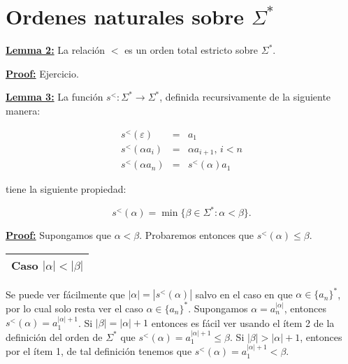 \section{Ordenes naturales sobre $\Sigma^{\ast}$}

  \textbf{\underline{Lemma 2:}} La relación $<$ es un orden total estricto sobre $\Sigma^{\ast}$.

  \textbf{\underline{Proof:}} Ejercicio.

  \QED

  \vspace{5mm}
  \textbf{\underline{Lemma 3:}} La función $s^{<}: \Sigma^{\ast} \rightarrow \Sigma^{\ast}$, definida recursivamente
    de la siguiente manera:

    \begin{eqnarray}
			\nonumber s^{<}(\varepsilon) &=& a_{1} \\
			\nonumber s^{<}(\alpha a_{i}) &=& \alpha a_{i + 1} \text{, } i < n \\
			\nonumber s^{<}(\alpha a_{n}) &=& s^{<}(\alpha) a_{1}
		\end{eqnarray}

    tiene la siguiente propiedad:

    \[
      \displaystyle s^{<}(\alpha) = \min \{\beta \in \Sigma^{\ast}: \alpha < \beta \}\text{.}
    \]

  \textbf{\underline{Proof:}} Supongamos que $\alpha < \beta $. Probaremos entonces que $s^{<}(\alpha )\leq \beta $.

    \vspace{3mm}
    \begin{tabular}{|c|}
      \hline Caso $\left\vert \alpha \right\vert < \left\vert \beta \right\vert$\\\hline
    \end{tabular}

    \par Se puede ver fácilmente que $\left\vert \alpha \right\vert = \left\vert s^{<}(\alpha) \right\vert$ salvo en el
    caso en que $\alpha \in \{a_{n}\}^{\ast}$, por lo cual solo resta ver el caso $\alpha \in \{a_{n}\}^{\ast}$.
    Supongamos $\alpha = a_{n}^{\left\vert \alpha \right\vert}$, entonces $s^{<}(\alpha) = a_{1}^{\left\vert \alpha
    \right\vert + 1}$. Si $\left\vert \beta \right\vert = \left\vert \alpha \right\vert + 1$ entonces es fácil ver
    usando el ítem 2 de la definición del orden de $\Sigma^{\ast}$ que $s^{<}(\alpha) = a_{1}^{\left\vert \alpha
    \right\vert + 1} \leq \beta$. Si $\left\vert \beta \right\vert > \left\vert \alpha \right\vert + 1$, entonces por
    el ítem 1, de tal definición tenemos que $s^{<}(\alpha) = a_{1}^{\left\vert \alpha \right\vert +1}< \beta$.


